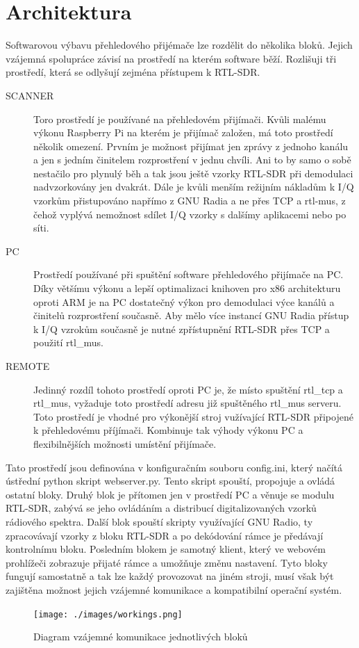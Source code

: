 \documentclass{ctuthesis}
\begin{document}
\section{Architektura}
Softwarovou výbavu přehledového přijémače lze rozdělit do několika bloků. Jejich vzájemná spolupráce závisí na prostředí na kterém software běží. Rozlišuji tři prostředí, která se odlyšují zejména přístupem k RTL-SDR.

\begin{description}
\item[SCANNER]
Toro prostředí je používané na přehledovém přijímači. Kvůli malému výkonu Raspberry Pi na kterém je přijímač založen, má toto prostředí několik omezení. Prvním je možnost přijímat jen zprávy z jednoho kanálu a jen s jedním činitelem rozprostření v jednu chvíli. Ani to by samo o sobě nestačilo pro plynulý běh a tak jsou ještě vzorky RTL-SDR při demodulaci nadvzorkovány jen dvakrát. Dále je kvůli menším režijním nákladům k I/Q vzorkům přistupováno napřímo z GNU Radia a ne  přes TCP a rtl-mus, z čehož vyplývá nemožnost sdílet I/Q vzorky s dalšímy aplikacemi nebo po síti.
\item[PC]
Prostředí používané při spuštění software přehledového přijímače na PC. Díky většímu výkonu a lepší optimalizaci knihoven pro x86 architekturu oproti ARM je na PC dostatečný výkon pro demodulaci výce kanálů a činitelů rozprostření současně. Aby mělo více instancí GNU Radia přístup k I/Q vzrokům současně je nutné zpřístupnění RTL-SDR přes TCP a použití rtl\_mus.
\item[REMOTE]
Jedinný rozdíl tohoto prostředí oproti PC je, že místo spuštění rtl\_tcp a rtl\_mus, vyžaduje toto prostředí adresu již spuštěného rtl\_mus serveru. Toto prostředí je vhodné pro výkonější stroj vužívající RTL-SDR připojené k přehledovému příjímači. Kombinuje tak výhody výkonu PC a flexibilnějších možnosti umístění přijímače.
\end{description}

Tato prostředí jsou definována v konfiguračním souboru config.ini, který načítá ústřední python skript webserver.py. Tento skript spouští, propojuje a ovládá ostatní bloky. Druhý blok je přítomen jen v prostředí PC a věnuje se modulu RTL-SDR, zabývá se jeho ovládáním a distribucí digitalizovaných vzorků rádiového spektra. Další blok spouští skripty využívající GNU Radio, ty zpracovávají vzorky z bloku RTL-SDR a po dekódování rámce je předávají kontrolnímu bloku. Posledním blokem je samotný klient, který ve webovém prohlížeči zobrazuje přijaté rámce a umožňuje změnu nastavení. Tyto bloky fungují samostatně a tak lze každý provozovat na jiném stroji, musí však být zajištěna možnost jejich vzájemné komunikace a kompatibilní operační systém.\begin{figure}
\caption{Diagram vzájemné komunikace jednotlivých bloků}
\texttt{[image: ./images/workings.png]}
\label{arch}
\end{figure}
\end{document}
